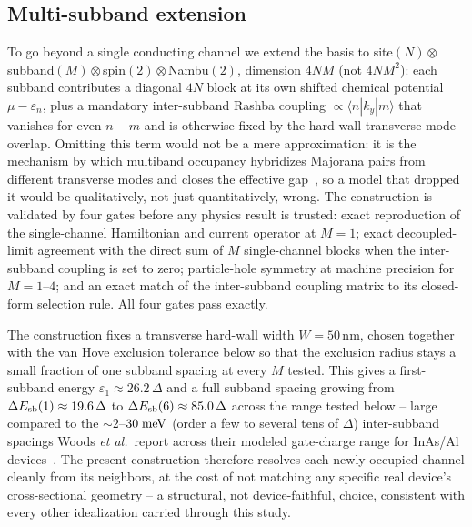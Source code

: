\documentclass[aps,physrev,reprint,superscriptaddress,amsmath,amssymb,floatfix]{revtex4-2}
\begin{document}
\FloatBarrier
\subsection{Multi-subband extension}

To go beyond a single conducting channel we extend the basis to
site$(N)\otimes$subband$(M)\otimes$spin$(2)\otimes$Nambu$(2)$, dimension
$4NM$ (not $4NM^2$): each subband contributes a diagonal $4N$ block at
its own shifted chemical potential $\mu-\varepsilon_n$, plus a
mandatory inter-subband Rashba coupling $\propto\langle n|k_y|m\rangle$
that vanishes for even $n-m$ and is otherwise fixed by the hard-wall
transverse mode overlap. Omitting this term would not be a mere
approximation: it is the mechanism by which multiband occupancy
hybridizes Majorana pairs from different transverse modes and closes the
effective gap~\cite{lim2012}, so a model that dropped it would be
qualitatively, not just quantitatively, wrong. The construction is
validated by four gates before any physics result is trusted: exact
reproduction of the single-channel Hamiltonian and current operator at
$M=1$; exact decoupled-limit agreement with the direct sum of $M$
single-channel blocks when the inter-subband coupling is set to zero;
particle-hole symmetry at machine precision for $M=1$--$4$; and an exact
match of the inter-subband coupling matrix to its closed-form selection
rule. All four gates pass exactly.

The construction fixes a transverse hard-wall width $W=50\,\mathrm{nm}$,
chosen together with the van Hove exclusion tolerance below so that the
exclusion radius stays a small fraction of one subband spacing at every
$M$ tested. This gives a first-subband energy $\varepsilon_1\approx26.2\,\Delta$
and a full subband spacing growing from $\Delta E_{\rm
sb}(1)\approx19.6\,\Delta$ to $\Delta E_{\rm sb}(6)\approx85.0\,\Delta$
across the range tested below -- large compared to the $\sim2$--$30\;{\rm
meV}$ (order a few to several tens of $\Delta$) inter-subband spacings
Woods \emph{et al.}\ report across their modeled gate-charge range for
InAs/Al devices~\cite{woods2020}. The present construction therefore
resolves each newly occupied channel cleanly from its neighbors, at the
cost of not matching any specific real device's cross-sectional
geometry -- a structural, not device-faithful, choice, consistent with
every other idealization carried through this study.
\end{document}
